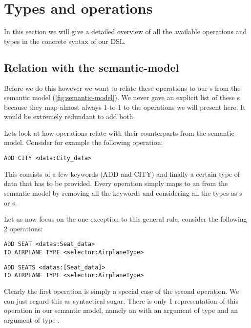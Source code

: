 \section{Types and operations}
\label{sec:operations}

In this section we will give a detailed overview of all the available
operations and types in the concrete syntax of our DSL.
 
\subsection{Relation with the semantic-model}

Before we do this however we want to relate these operations to our
s from the semantic model (\ref{fig:semantic-model}). We never
gave an explicit list of these s because they map almost
always 1-to-1 to the operations we will present here. It would be extremely
redundant to add both.

Lets look at how operations relate with their counterparts from the
semantic-model. Consider for example the following operation:

\begin{operation}
  \lstinline{ADD CITY <data:City_data>}
  \label{op:add_city}
\end{operation}

This consists of a few keywords (ADD and CITY) and
finally a certain type of data that has to be provided. Every operation simply
maps to an  from the semantic model by removing all the keywords and
considering all the types as s or s.

Let us now focus on the one exception to this general rule, consider the
following 2 operations:
\begin{operation}
  \begin{lstlisting}
ADD SEAT <datas:Seat_data>
TO AIRPLANE TYPE <selector:AirplaneType>
  \end{lstlisting}
  \label{op:add_seats}
\end{operation}
\begin{operation}
  \begin{lstlisting}
ADD SEATS <datas:[Seat_data]>
TO AIRPLANE TYPE <selector:AirplaneType>
  \end{lstlisting}
  \label{op:add_seats}
\end{operation}
Clearly the first operation is simply a special case of the second operation.
We can just regard this as syntactical sugar. There is only 1 representation of
this operation in our semantic model, namely an 
 with an argument of type  and an
argument of type .


